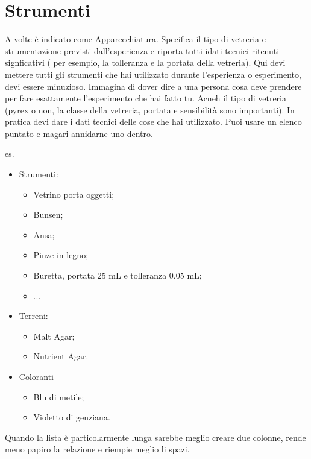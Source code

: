 \section{Strumenti}
A volte è indicato come Apparecchiatura.
Specifica il tipo di vetreria e strumentazione previsti dall'esperienza e riporta tutti  idati tecnici ritenuti signficativi ( per esempio, la tolleranza e la portata della vetreria). Qui devi mettere tutti gli strumenti che hai utilizzato durante l'esperienza o esperimento, devi essere minuzioso. Immagina di dover dire a una persona cosa deve prendere per fare esattamente l'esperimento che hai fatto tu. Acneh il tipo di vetreria (pyrex o non, la classe della vetreria, portata e sensibilità sono importanti). In pratica devi dare i dati tecnici delle cose che hai utilizzato. Puoi usare un elenco puntato e magari annidarne uno dentro.

es.
\begin{itemize}
    \item Strumenti:
    \begin{itemize}
        \item Vetrino porta oggetti;
        \item Bunsen;
        \item Ansa;
        \item Pinze in legno;
        \item Buretta, portata 25 mL e tolleranza 0.05 mL;
        \item ...
    \end{itemize}
    \item Terreni:
    \begin{itemize}
    \item Malt Agar;
    \item Nutrient Agar.
    \end{itemize}
    \item Coloranti
    \begin{itemize}
        \item Blu di metile;
        \item Violetto di genziana.
    \end{itemize}
\end{itemize}

Quando la lista è particolarmente lunga sarebbe meglio creare due colonne, rende meno papiro la relazione e riempie meglio li spazi.

